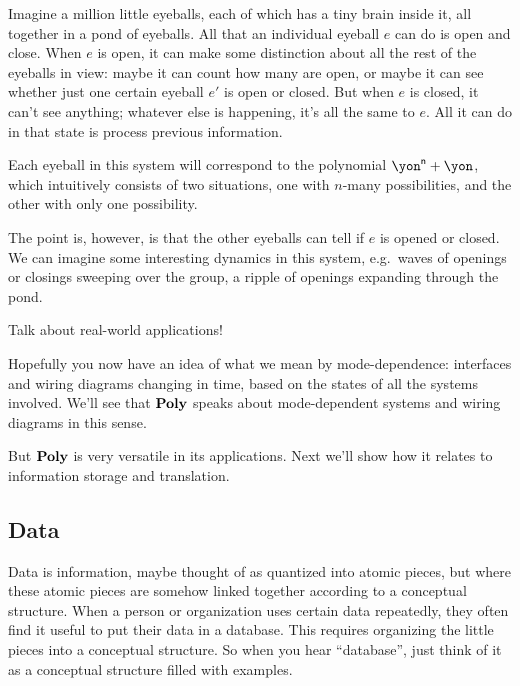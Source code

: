 \documentclass[DynamicalBook]{subfiles}
\begin{document}
\begin{example}
Imagine a million little eyeballs, each of which has a tiny brain inside it, all together in a pond of eyeballs. All that an individual eyeball $e$ can do is open and close. When $e$ is open, it can make some distinction about all the rest of the eyeballs in view: maybe it can count how many are open, or maybe it can see whether just one certain eyeball $e'$ is open or closed. But when $e$ is closed, it can't see anything; whatever else is happening, it's all the same to $e$. All it can do in that state is process previous information.

Each eyeball in this system will correspond to the polynomial $\yon^\ord{n}+\yon$, which intuitively consists of two situations, one with $n$-many possibilities, and the other with only one possibility.

The point is, however, is that the other eyeballs can tell if $e$ is opened or closed. We can imagine some interesting dynamics in this system, e.g.\ waves of openings or closings sweeping over the group, a ripple of openings expanding through the pond.

Talk about real-world applications!
\end{example}

Hopefully you now have an idea of what we mean by mode-dependence: interfaces and wiring diagrams changing in time, based on the states of all the systems involved. We'll see that $\textbf{Poly}$ speaks about mode-dependent systems and wiring diagrams in this sense. 

But $\textbf{Poly}$ is very versatile in its applications. Next we'll show how it relates to information storage and translation.

\subsection{Data}

Data is information, maybe thought of as quantized into atomic pieces, but where these atomic pieces are somehow linked together according to a conceptual structure. When a person or organization uses certain data repeatedly, they often find it useful to put their data in a database. This requires organizing the little pieces into a conceptual structure. So when you hear ``database'', just think of it as a conceptual structure filled with examples.
\end{document}
